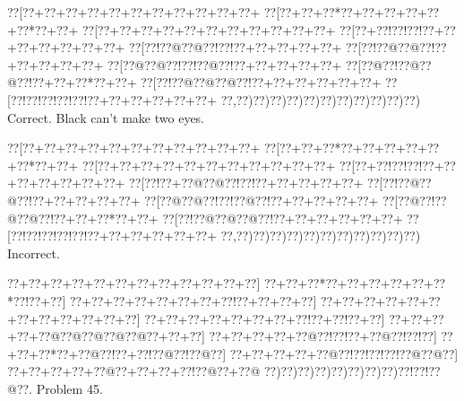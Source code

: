 \documentclass[a5paper]{article}
\begin{document}
\begin{center}
{\goo
\0??[\0??+\0??+\0??+\0??+\0??+\0??+\0??+\0??+\0??+\0??+\0??+
\0??[\0??+\0??+\0??*\0??+\0??+\0??+\0??+\0??+\0??*\0??+\0??+
\0??[\0??+\0??+\0??+\0??+\0??+\0??+\0??+\0??+\0??+\0??+\0??+
\0??[\0??+\0??!\0??!\0??!\0??+\0??+\0??+\0??+\0??+\0??+\0??+
\0??[\0??!\0??@\0??@\0??!\0??!\0??+\0??+\0??+\0??+\0??+
\0??[\0??!\0??@\0??@\0??!\0??+\0??+\0??+\0??+\0??+
\0??[\0??@\0??@\0??!\0??!\0??@\0??!\0??+\0??+\0??+\0??+\0??+
\0??[\0??@\0??!\0??@\0??@\0??!\0??+\0??+\0??*\0??+\0??+
\0??[\0??!\0??@\0??@\0??@\0??!\0??+\0??+\0??+\0??+\0??+\0??+
\0??[\0??!\0??!\0??!\0??!\0??!\0??+\0??+\0??+\0??+\0??+\0??+
\0??,\0??)\0??)\0??)\0??)\0??)\0??)\0??)\0??)\0??)\0??)\0??)
}
Correct. Black can't make two eyes.

\end{center}
\begin{center}
{\goo
\0??[\0??+\0??+\0??+\0??+\0??+\0??+\0??+\0??+\0??+\0??+\0??+
\0??[\0??+\0??+\0??*\0??+\0??+\0??+\0??+\0??+\0??*\0??+\0??+
\0??[\0??+\0??+\0??+\0??+\0??+\0??+\0??+\0??+\0??+\0??+\0??+
\0??[\0??+\0??!\0??!\0??!\0??+\0??+\0??+\0??+\0??+\0??+\0??+
\0??[\0??!\0??+\0??@\0??@\0??!\0??!\0??+\0??+\0??+\0??+\0??+
\0??[\0??!\0??@\0??@\0??!\0??+\0??+\0??+\0??+\0??+
\0??[\0??@\0??@\0??!\0??!\0??@\0??!\0??+\0??+\0??+\0??+\0??+
\0??[\0??@\0??!\0??@\0??@\0??!\0??+\0??+\0??*\0??+\0??+
\0??[\0??!\0??@\0??@\0??@\0??!\0??+\0??+\0??+\0??+\0??+\0??+
\0??[\0??!\0??!\0??!\0??!\0??!\0??+\0??+\0??+\0??+\0??+\0??+
\0??,\0??)\0??)\0??)\0??)\0??)\0??)\0??)\0??)\0??)\0??)\0??)
}
Incorrect. 

\end{center}
\newpage
\begin{center}
{\goo
\0??+\0??+\0??+\0??+\0??+\0??+\0??+\0??+\0??+\0??+\0??+\0??]
\0??+\0??+\0??*\0??+\0??+\0??+\0??+\0??+\0??*\0??!\0??+\0??]
\0??+\0??+\0??+\0??+\0??+\0??+\0??+\0??!\0??+\0??+\0??+\0??]
\0??+\0??+\0??+\0??+\0??+\0??+\0??+\0??+\0??+\0??+\0??+\0??]
\0??+\0??+\0??+\0??+\0??+\0??+\0??+\0??!\0??+\0??!\0??+\0??]
\0??+\0??+\0??+\0??+\0??@\0??@\0??@\0??@\0??@\0??+\0??+\0??]
\0??+\0??+\0??+\0??+\0??@\0??!\0??!\0??+\0??@\0??!\0??!\0??]
\0??+\0??+\0??*\0??+\0??@\0??!\0??+\0??!\0??@\0??!\0??@\0??]
\0??+\0??+\0??+\0??+\0??@\0??!\0??!\0??!\0??!\0??@\0??@\0??]
\0??+\0??+\0??+\0??+\0??@\0??+\0??+\0??+\0??!\0??@\0??+\0??@
\0??)\0??)\0??)\0??)\0??)\0??)\0??)\0??)\0??!\0??!\0??@\0??.
}
Problem 45.

\end{center}
\end{document}
